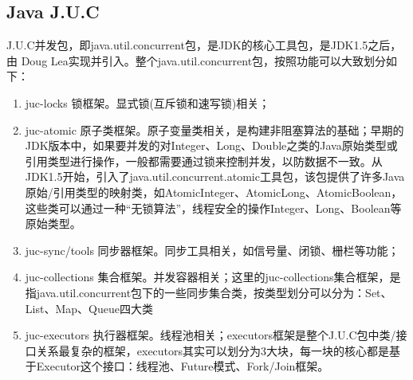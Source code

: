 \documentclass[../../../interview-questions.tex]{subfiles}
\begin{document}
\subsection{Java J.U.C}

J.U.C并发包，即java.util.concurrent包，是JDK的核心工具包，是JDK1.5之后，由 Doug Lea实现并引入。整个java.util.concurrent包，按照功能可以大致划分如下：

\begin{enumerate}
\item {juc-locks 锁框架。}显式锁(互斥锁和速写锁)相关；
\item {juc-atomic 原子类框架。}原子变量类相关，是构建非阻塞算法的基础；早期的JDK版本中，如果要并发的对Integer、Long、Double之类的Java原始类型或引用类型进行操作，一般都需要通过锁来控制并发，以防数据不一致。从JDK1.5开始，引入了java.util.concurrent.atomic工具包，该包提供了许多Java原始/引用类型的映射类，如AtomicInteger、AtomicLong、AtomicBoolean，这些类可以通过一种“无锁算法”，线程安全的操作Integer、Long、Boolean等原始类型。
\item {juc-sync/tools 同步器框架。}同步工具相关，如信号量、闭锁、栅栏等功能；
\item {juc-collections 集合框架。}并发容器相关；这里的juc-collections集合框架，是指java.util.concurrent包下的一些同步集合类，按类型划分可以分为：Set、List、Map、Queue四大类
\item{juc-executors 执行器框架。}线程池相关；executors框架是整个J.U.C包中类/接口关系最复杂的框架，executors其实可以划分为3大块，每一块的核心都是基于Executor这个接口：线程池、Future模式、Fork/Join框架。
\end{enumerate}
\end{document}
